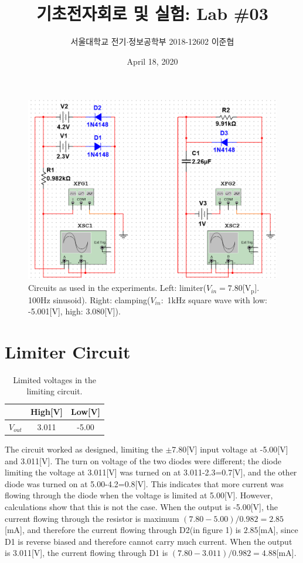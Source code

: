 \documentclass[a4paper, itemph]{oblivoir}
\theoremstyle{definition}
\begin{document}
\title{기초전자회로 및 실험: Lab \#03}
\author{서울대학교 전기$\cdot$정보공학부 2018-12602 이준협}
\date{April 18, 2020}
\maketitle
\begin{figure}[htb]
    \centering
    \includegraphics[width=0.5\linewidth]{lab3.PNG}
    \caption{Circuits as used in the experiments. Left: limiter($V_{in}=7.80$[$\mathrm{V_p}$]. 100Hz sinusoid). Right: clamping($V_{in}:$ 1kHz square wave with low: -5.001[V], high: 3.080[V]).}
\end{figure}

\section{Limiter Circuit}

\begin{table}[htb]
    \centering
    \begin{tabular}{c|c|c}
         &  High[V] & Low[V]\\
         \hline
         $V_{out}$& 3.011 & -5.00
    \end{tabular}
    \caption{Limited voltages in the limiting circuit.}
\end{table}
The circuit worked as designed, limiting the $\pm$7.80[V] input voltage at -5.00[V] and 3.011[V]. The turn on voltage of the two diodes were different; the diode limiting the voltage at 3.011[V] was turned on at 3.011-2.3=0.7[V], and the other diode was turned on at 5.00-4.2=0.8[V]. This indicates that more current was flowing through the diode when the voltage is limited at 5.00[V]. However, calculations show that this is not the case. When the output is -5.00[V], the current flowing through the resistor is maximum $(7.80-5.00)/0.982=2.85$[mA], and therefore the current flowing through D2(in figure 1) is $2.85$[mA], since D1 is reverse biased and therefore cannot carry much current. When the output is 3.011[V], the current flowing through D1 is $(7.80-3.011)/0.982=4.88$[mA]. 
\end{document}
